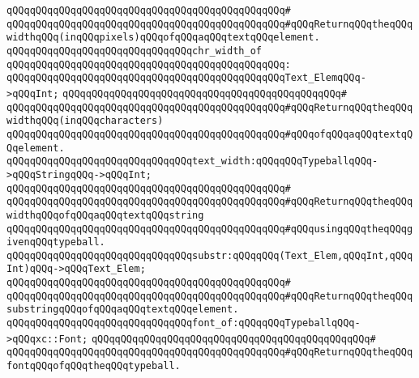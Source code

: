 \verb|qQQqqQQqqQQqqQQqqQQqqQQqqQQqqQQqqQQqqQQqqQQqqQQq#|\newline
\verb|qQQqqQQqqQQqqQQqqQQqqQQqqQQqqQQqqQQqqQQqqQQqqQQq#qQQqReturnqQQqtheqQQqwidthqQQq(inqQQqpixels)qQQqofqQQqaqQQqtextqQQqelement.|\newline
\newline
\verb|qQQqqQQqqQQqqQQqqQQqqQQqqQQqqQQqchr_width_of|\newline
\verb|qQQqqQQqqQQqqQQqqQQqqQQqqQQqqQQqqQQqqQQqqQQqqQQq:|\newline
\verb|qQQqqQQqqQQqqQQqqQQqqQQqqQQqqQQqqQQqqQQqqQQqqQQqText_ElemqQQq->qQQqInt;|\newline
\verb|qQQqqQQqqQQqqQQqqQQqqQQqqQQqqQQqqQQqqQQqqQQqqQQq#|\newline
\verb|qQQqqQQqqQQqqQQqqQQqqQQqqQQqqQQqqQQqqQQqqQQqqQQq#qQQqReturnqQQqtheqQQqwidthqQQq(inqQQqcharacters)|\newline
\verb|qQQqqQQqqQQqqQQqqQQqqQQqqQQqqQQqqQQqqQQqqQQqqQQq#qQQqofqQQqaqQQqtextqQQqelement.|\newline
\newline
\verb|qQQqqQQqqQQqqQQqqQQqqQQqqQQqqQQqtext_width:qQQqqQQqTypeballqQQq->qQQqStringqQQq->qQQqInt;|\newline
\verb|qQQqqQQqqQQqqQQqqQQqqQQqqQQqqQQqqQQqqQQqqQQqqQQq#|\newline
\verb|qQQqqQQqqQQqqQQqqQQqqQQqqQQqqQQqqQQqqQQqqQQqqQQq#qQQqReturnqQQqtheqQQqwidthqQQqofqQQqaqQQqtextqQQqstring|\newline
\verb|qQQqqQQqqQQqqQQqqQQqqQQqqQQqqQQqqQQqqQQqqQQqqQQq#qQQqusingqQQqtheqQQqgivenqQQqtypeball.|\newline
\newline
\verb|qQQqqQQqqQQqqQQqqQQqqQQqqQQqqQQqsubstr:qQQqqQQq(Text_Elem,qQQqInt,qQQqInt)qQQq->qQQqText_Elem;|\newline
\verb|qQQqqQQqqQQqqQQqqQQqqQQqqQQqqQQqqQQqqQQqqQQqqQQq#|\newline
\verb|qQQqqQQqqQQqqQQqqQQqqQQqqQQqqQQqqQQqqQQqqQQqqQQq#qQQqReturnqQQqtheqQQqsubstringqQQqofqQQqaqQQqtextqQQqelement.|\newline
\newline
\verb|qQQqqQQqqQQqqQQqqQQqqQQqqQQqqQQqfont_of:qQQqqQQqTypeballqQQq->qQQqxc::Font;|\newline
\verb|qQQqqQQqqQQqqQQqqQQqqQQqqQQqqQQqqQQqqQQqqQQqqQQq#|\newline
\verb|qQQqqQQqqQQqqQQqqQQqqQQqqQQqqQQqqQQqqQQqqQQqqQQq#qQQqReturnqQQqtheqQQqfontqQQqofqQQqtheqQQqtypeball.|\newline
\newline
